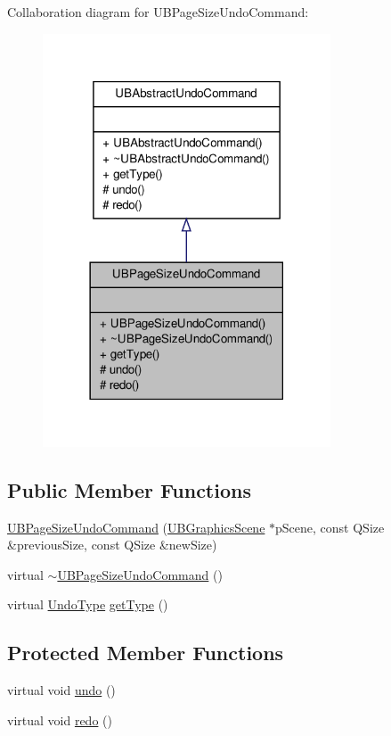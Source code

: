 Collaboration diagram for U\-B\-Page\-Size\-Undo\-Command\-:
\nopagebreak
\begin{figure}[H]
\begin{center}
\leavevmode
\includegraphics[width=242pt]{dc/d83/class_u_b_page_size_undo_command__coll__graph}
\end{center}
\end{figure}
\subsection*{Public Member Functions}
\begin{DoxyCompactItemize}
\item 
\hyperlink{class_u_b_page_size_undo_command_a48218377a4b906b2e0f0aa682a94863f}{U\-B\-Page\-Size\-Undo\-Command} (\hyperlink{class_u_b_graphics_scene}{U\-B\-Graphics\-Scene} $\ast$p\-Scene, const Q\-Size \&previous\-Size, const Q\-Size \&new\-Size)
\item 
virtual \hyperlink{class_u_b_page_size_undo_command_ae113fb8432d48bd7055b166ee987d97c}{$\sim$\-U\-B\-Page\-Size\-Undo\-Command} ()
\item 
virtual \hyperlink{class_u_b_abstract_undo_command_a85016029bd4ceb03a8247b3c01e2bd97}{Undo\-Type} \hyperlink{class_u_b_page_size_undo_command_afcf64fc1e7d0e364a07d21ae22a5f9c2}{get\-Type} ()
\end{DoxyCompactItemize}
\subsection*{Protected Member Functions}
\begin{DoxyCompactItemize}
\item 
virtual void \hyperlink{class_u_b_page_size_undo_command_a94c683dc241bc250649f83de89bdbc7e}{undo} ()
\item 
virtual void \hyperlink{class_u_b_page_size_undo_command_ae0410b91c54a382137eb189502c7b765}{redo} ()
\end{DoxyCompactItemize}
